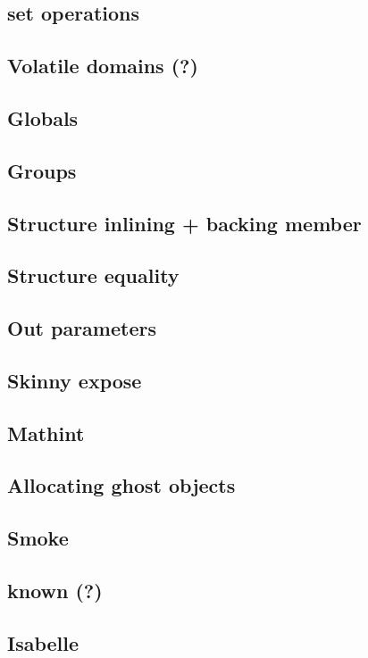 \subsection{set operations}
\subsection{Volatile domains (?)}

\subsection{Globals}
\subsection{Groups}
\subsection{Structure inlining + backing member}
\subsection{Structure equality}
\subsection{Out parameters}
\subsection{Skinny expose}
\subsection{Mathint}
\subsection{Allocating ghost objects}
\subsection{Smoke}
\subsection{known (?)}
\subsection{Isabelle}
